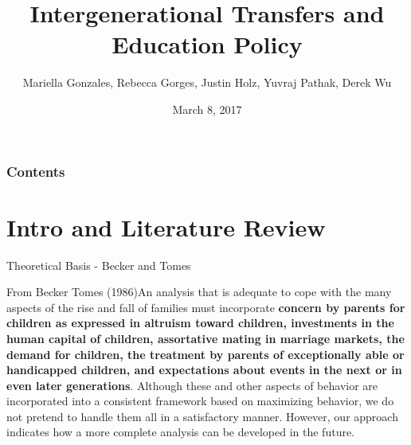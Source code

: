 \documentclass{beamer}
\title[Intergenerational mobility]{Intergenerational Transfers and Education Policy}
\author{Mariella Gonzales, Rebecca Gorges, Justin Holz, Yuvraj Pathak, Derek Wu}
\institute{ECON 350: Human Capital, Markets, and the Family}
\date{March 8, 2017}
\begin{document}
\begin{frame}
\titlepage %
\end{frame}

\begin{frame}
\frametitle{Contents} %
\tableofcontents %
\end{frame}


\section{Intro and Literature Review}

\begin{frame}{Theoretical Basis - Becker and Tomes}


\begin{block}{From Becker Tomes (1986)}An analysis that is adequate to cope with the many aspects of the rise and fall of families must incorporate \textbf{concern by parents for children as expressed in altruism toward children, investments in the human capital of children, assortative mating in marriage markets, the demand for children, the treatment by parents of exceptionally able or handicapped children, and expectations about events in the next or in even later generations}. Although these and other aspects of behavior are incorporated into a consistent framework based on maximizing behavior, we do not pretend to handle them all in a satisfactory manner. However, our approach indicates how a more complete analysis can be developed in the future.
\end{block}
\end{frame}
\end{document}
